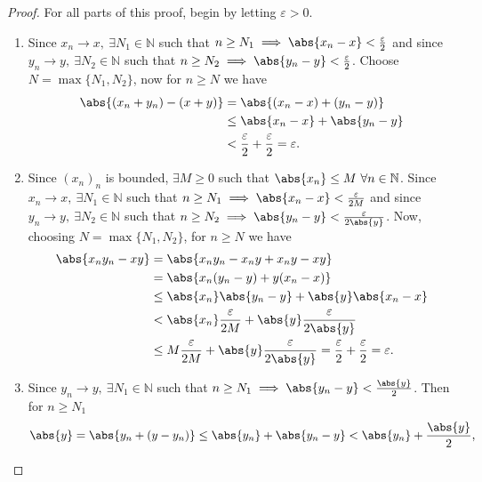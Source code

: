 \documentclass[../real_analysis.tex]{subfiles}
\begin{document}
            \begin{proof}
                For all parts of this proof, begin by letting $\varepsilon>0$.
                \begin{enumerate}[label={\upshape(\roman*)}]
                    \item Since $x_n\to x,\ \exists N_1\in\mathbb{N}$ such that $n\geq N_1\implies\abs{x_n-x}<\frac{\varepsilon}{2}$ and since $y_n\to y,\ \exists N_2\in\mathbb{N}$ such that $n\geq N_2\implies\abs{y_n-y}<\frac{\varepsilon}{2}$. Choose $N=\max\{N_1, N_2\}$, now for $n\geq N$ we have
                    \begin{align}
                        \abs{(x_n+y_n)-(x+y)} &= \abs{(x_n-x)+(y_n-y)}\\
                        &\leq\abs{x_n-x}+\abs{y_n-y}\\
                        &<\frac{\varepsilon}{2}+\frac{\varepsilon}{2}=\varepsilon.
                    \end{align}
                    \item Since $(x_n)_n$ is bounded, $\exists M\geq0$ such that $\abs{x_n}\leq M\ \forall n\in\mathbb{N}$. Since $x_n\to x,\ \exists N_1\in\mathbb{N}$ such that $n\geq N_1\implies\abs{x_n-x}<\frac{\varepsilon}{2M}$ and since $y_n\to y,\ \exists N_2\in\mathbb{N}$ such that $n\geq N_2\implies\abs{y_n-y}<\frac{\varepsilon}{2\abs{y}}$. Now, choosing $N=\max\{N_1, N_2\}$, for $n\geq N$ we have
                    \begin{align}
                        \abs{x_ny_n-xy}&=\abs{x_ny_n-x_ny+x_ny-xy}\\
                        &=\abs{x_n(y_n-y)+y(x_n-x)}\\
                        &\leq\abs{x_n}\abs{y_n-y}+\abs{y}\abs{x_n-x}\\
                        &<\abs{x_n}\frac{\varepsilon}{2M}+\abs{y}\frac{\varepsilon}{2\abs{y}}\\
                        &\leq M\frac{\varepsilon}{2M}+\abs{y}\frac{\varepsilon}{2\abs{y}}=\frac{\varepsilon}{2}+\frac{\varepsilon}{2}=\varepsilon.
                    \end{align}
                    \item Since $y_n\to y,\ \exists N_1\in\mathbb{N}$ such that $n\geq N_1\implies\abs{y_n-y}<\frac{\abs{y}}{2}$. Then for $n\geq N_1$
                    \begin{equation}
                        \abs{y}=\abs{y_n+(y-y_n)}\leq\abs{y_n}+\abs{y_n-y}<\abs{y_n}+\frac{\abs{y}}{2},
                    \end{equation}

\end{enumerate}
\end{proof}
\end{document}
